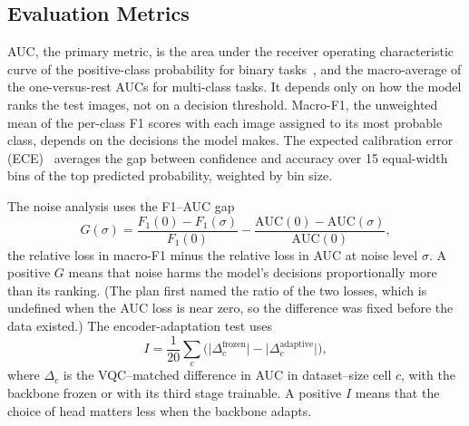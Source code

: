 \documentclass{ieeeaccess}
\newcommand{\vqc}{VQC}
\begin{document}
\subsection{Evaluation Metrics}
\label{sec:metrics}
AUC, the primary metric, is the area under the receiver operating characteristic curve of the positive-class probability for binary tasks~\cite{fawcett2006}, and the macro-average of the one-versus-rest AUCs for multi-class tasks. It depends only on how the model ranks the test images, not on a decision threshold. Macro-F1, the unweighted mean of the per-class F1 scores with each image assigned to its most probable class, depends on the decisions the model makes. The expected calibration error (ECE)~\cite{guo2017} averages the gap between confidence and accuracy over 15 equal-width bins of the top predicted probability, weighted by bin size.

The noise analysis uses the F1--AUC gap
\begin{equation}
G(\sigma)=\frac{F_1(0)-F_1(\sigma)}{F_1(0)}-\frac{\mathrm{AUC}(0)-\mathrm{AUC}(\sigma)}{\mathrm{AUC}(0)} ,
\label{eq:gap}
\end{equation}
the relative loss in macro-F1 minus the relative loss in AUC at noise level $\sigma$. A positive $G$ means that noise harms the model's decisions proportionally more than its ranking. (The plan first named the ratio of the two losses, which is undefined when the AUC loss is near zero, so the difference was fixed before the data existed.) The encoder-adaptation test uses
\begin{equation}
I=\frac{1}{20}\sum_{c}\Big(\big|\Delta_c^{\mathrm{frozen}}\big|-\big|\Delta_c^{\mathrm{adaptive}}\big|\Big),
\label{eq:enc}
\end{equation}
where $\Delta_c$ is the \vqc{}--matched difference in AUC in dataset--size cell $c$, with the backbone frozen or with its third stage trainable. A positive $I$ means that the choice of head matters less when the backbone adapts.
\end{document}
